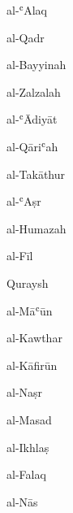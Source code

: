 \item al-ʿAlaq
\item al-Qadr
\item al-Bayyinah
\item al-Zalzalah
\item al-ʿĀdiyāt
\item al-Qāriʿah
\item al-Takāthur
\item al-ʿAṣr
\item al-Humazah
\item al-Fīl
\item Quraysh
\item al-Māʿūn
\item al-Kawthar
\item al-Kāfirūn
\item al-Naṣr
\item al-Masad
\item al-Ikhlaṣ
\item al-Falaq
\item al-Nās


